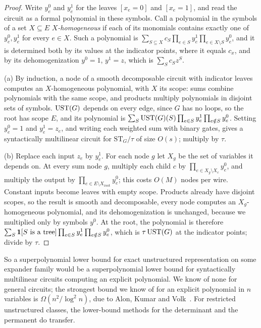 \begin{proof}
Write $y^0_e$ and $y^1_e$ for the leaves $[x_e=0]$ and $[x_e=1]$, and read the circuit as a formal polynomial in these symbols. Call a polynomial in the symbols of a set $X\subseteq E$ \emph{$X$-homogeneous} if each of its monomials contains exactly one of $y^0_e,y^1_e$ for every $e\in X$. Such a polynomial is $\sum_{S\subseteq X}c_S\prod_{e\in S}y^1_e\prod_{e\in X\setminus S}y^0_e$, and it is determined both by its values at the indicator points, where it equals $c_x$, and by its dehomogenization $y^0=1$, $y^1=z$, which is $\sum_Sc_Sz^S$.

(a) By induction, a node of a smooth decomposable circuit with indicator leaves computes an $X$-homogeneous polynomial, with $X$ its scope: sums combine polynomials with the same scope, and products multiply polynomials in disjoint sets of symbols. $\mathrm{UST}(G)$ depends on every edge, since $G$ has no loops, so the root has scope $E$, and its polynomial is $\sum_S\mathrm{UST}(G)(S)\prod_{e\in S}y^1_e\prod_{e\notin S}y^0_e$. Setting $y^0_e=1$ and $y^1_e=z_e$, and writing each weighted sum with binary gates, gives a syntactically multilinear circuit for $\mathrm{ST}_G/\tau$ of size $O(s)$; multiply by $\tau$.

(b) Replace each input $z_e$ by $y^1_e$. For each node $g$ let $X_g$ be the set of variables it depends on. At every sum node $g$, multiply each child $c$ by $\prod_{e\in X_g\setminus X_c}y^0_e$, and multiply the output by $\prod_{e\in E\setminus X_{\mathrm{root}}}y^0_e$; this costs $O(M)$ nodes per wire. Constant inputs become leaves with empty scope. Products already have disjoint scopes, so the result is smooth and decomposable, every node computes an $X_g$-homogeneous polynomial, and its dehomogenization is unchanged, because we multiplied only by symbols $y^0$. At the root, the polynomial is therefore $\sum_S\mathbf{1}[S\text{ is a tree}]\prod_{e\in S}y^1_e\prod_{e\notin S}y^0_e$, which is $\tau\,\mathrm{UST}(G)$ at the indicator points; divide by $\tau$.
\end{proof}

So a superpolynomial lower bound for exact unstructured representation on some expander family would be a superpolynomial lower bound for syntactically multilinear circuits computing an explicit polynomial. We know of none for general circuits; the strongest bound we know of for an explicit polynomial in $n$ variables is $\Omega(n^2/\log^2n)$, due to Alon, Kumar and Volk~\cite{AlonKumarVolk18}. For restricted unstructured classes, the lower-bound methods for the determinant and the permanent do transfer.

